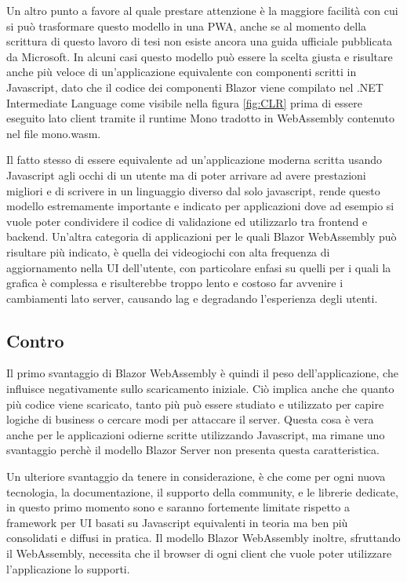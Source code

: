 Un altro punto a favore al quale prestare attenzione \`e la maggiore facilit\`a con cui si pu\`o trasformare questo modello in una PWA, anche se al momento della scrittura di questo lavoro di tesi non esiste ancora una guida ufficiale pubblicata da Microsoft.
In alcuni casi questo modello pu\`o essere la scelta giusta e risultare anche pi\`u veloce di un'applicazione equivalente con componenti scritti in Javascript, dato che il codice dei componenti Blazor viene compilato nel .NET Intermediate Language come visibile nella figura \ref{fig:CLR}  prima di essere eseguito lato client tramite il runtime Mono tradotto in WebAssembly contenuto nel file mono.wasm.

Il fatto stesso di essere equivalente ad un'applicazione moderna scritta usando Javascript agli occhi di un utente ma di poter arrivare ad avere prestazioni migliori e di scrivere in un linguaggio diverso dal solo javascript, rende questo modello estremamente importante e indicato per applicazioni dove ad esempio si vuole poter condividere il codice di validazione ed utilizzarlo tra frontend e backend.
Un'altra categoria di applicazioni per le quali Blazor WebAssembly pu\`o risultare pi\`u indicato, \`e quella dei videogiochi con alta frequenza di aggiornamento nella UI dell'utente, con particolare enfasi su quelli per i quali la grafica \`e complessa e risulterebbe troppo lento e costoso far avvenire i cambiamenti lato server, causando lag e degradando l'esperienza degli utenti.
 
\subsection{Contro}\label{sez:controBWA}
Il primo svantaggio di Blazor WebAssembly \`e quindi il peso dell'applicazione, che influisce negativamente sullo scaricamento iniziale.
Ci\`o implica anche che quanto pi\`u codice viene scaricato, tanto pi\`u pu\`o essere studiato e utilizzato per capire logiche di business o cercare modi per attaccare il server.
Questa cosa \`e vera anche per le applicazioni odierne scritte utilizzando Javascript, ma rimane uno svantaggio perch\`e il modello Blazor Server non presenta questa caratteristica.

Un ulteriore svantaggio da tenere in considerazione, \`e che come per ogni nuova tecnologia, la documentazione, il supporto della community, e le librerie dedicate, in questo primo momento sono e saranno fortemente limitate rispetto a framework per UI basati su Javascript equivalenti in teoria ma ben pi\`u consolidati e diffusi in pratica.
Il modello Blazor WebAssembly inoltre, sfruttando il WebAssembly, necessita che il browser di ogni client che vuole poter utilizzare l'applicazione lo supporti.

